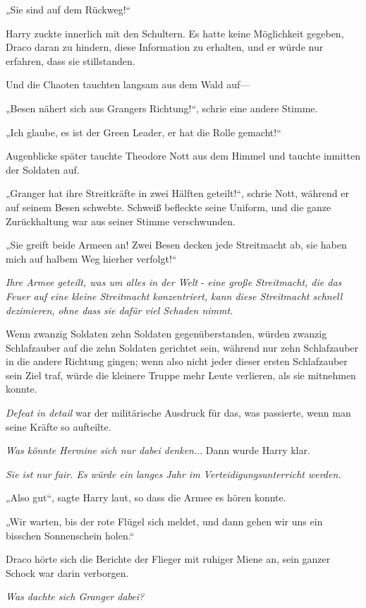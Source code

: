 {„Sie sind auf dem Rückweg!“

Harry zuckte innerlich mit den Schultern. Es hatte keine Möglichkeit gegeben, Draco daran zu hindern, diese Information zu erhalten, und er würde nur erfahren, dass sie stillstanden.

Und die Chaoten tauchten langsam aus dem Wald auf—

„Besen nähert sich aus Grangers Richtung!“, schrie eine andere Stimme.

„Ich glaube, es ist der Green Leader, er hat die Rolle gemacht!“

Augenblicke später tauchte Theodore Nott aus dem Himmel und tauchte inmitten der Soldaten auf.

„Granger hat ihre Streitkräfte in zwei Hälften geteilt!“, schrie Nott, während er auf seinem Besen schwebte. Schweiß befleckte seine Uniform, und die ganze Zurückhaltung war aus seiner Stimme verschwunden.

„Sie greift beide Armeen an! Zwei Besen decken jede Streitmacht ab, sie haben mich auf halbem Weg hierher verfolgt!“

\emph{Ihre Armee geteilt, was um alles in der Welt} - \emph{eine große Streitmacht, die das Feuer auf eine kleine Streitmacht konzentriert, kann diese Streitmacht schnell dezimieren, ohne dass sie dafür viel Schaden nimmt.}

Wenn zwanzig Soldaten zehn Soldaten gegenüberstanden, würden zwanzig Schlafzauber auf die zehn Soldaten gerichtet sein, während nur zehn Schlafzauber in die andere Richtung gingen; wenn also nicht jeder dieser ersten Schlafzauber sein Ziel traf, würde die kleinere Truppe mehr Leute verlieren, als sie mitnehmen konnte.

\emph{Defeat in detail} war der militärische Ausdruck für das, was passierte, wenn man seine Kräfte so aufteilte.

\emph{Was könnte Hermine sich nur dabei denken.}.. Dann wurde Harry klar.

\emph{Sie ist nur fair. Es würde ein langes Jahr im Verteidigungsunterricht werden.}

„Also gut“, sagte Harry laut, so dass die Armee es hören konnte.

„Wir warten, bis der rote Flügel sich meldet, und dann gehen wir uns ein bisschen Sonnenschein holen.“

Draco hörte sich die Berichte der Flieger mit ruhiger Miene an, sein ganzer Schock war darin verborgen.

\emph{Was dachte sich Granger dabei?}

}
